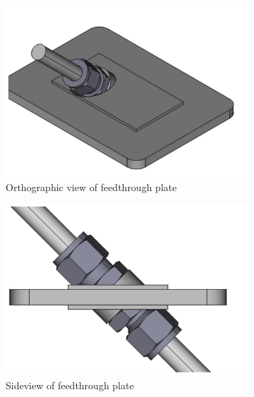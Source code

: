 \documentclass[11pt]{article}
\begin{document}
\begin{figure}
  \begin{center}
    \begin{subfigure}{0.3\textwidth}
      \includegraphics[width=\textwidth]{UmbilicalFeedthroughOrtho_2.pdf}
      \caption{Orthographic view of feedthrough plate}
      \label{fig:UFOrtho}
    \end{subfigure}
    \begin{subfigure}{0.3\textwidth}
      \includegraphics[width=\textwidth]{UmbilicalFeedthroughSideview_2.pdf}
      \caption{Sideview of feedthrough plate}
      \label{fig:UFSide}
    \end{subfigure}
    \begin{subfigure}{0.6\textwidth}

\end{subfigure}
\end{center}
\end{figure}
\end{document}
